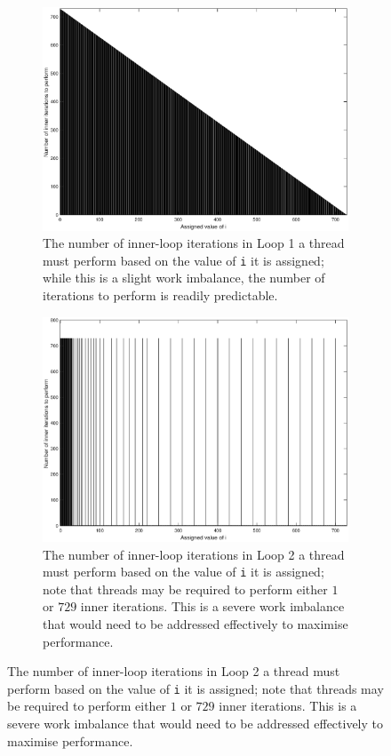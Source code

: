 \documentclass{article} %
\newcommand{\tp}{\texttt}
\begin{document}
\begin{figure}
    \centering
    \begin{subfigure}{0.45\textwidth}
        \includegraphics[width=\linewidth]{part1_plots/loop1_balancing.eps}
        \caption{The number of inner-loop iterations in Loop 1 a thread must perform based on the value of \tp{i} it is assigned; while this is a slight work imbalance, the number of iterations to perform is readily predictable.}
        \label{fig:loop1work}
    \end{subfigure}
    \begin{subfigure}{0.45\textwidth}
        \includegraphics[width=\linewidth]{part1_plots/loop2_balancing.eps}
        \caption{The number of inner-loop iterations in Loop 2 a thread must perform based on the value of \tp{i} it is assigned; note that threads may be required to perform either $1$ or $729$ inner iterations. This is a severe work imbalance that would need to be addressed effectively to maximise performance.}
        \label{fig:loop2work}
    \end{subfigure}
\end{figure}
\end{document}
